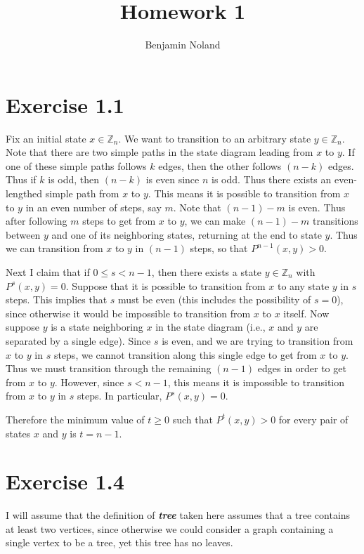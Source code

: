 \documentclass[12pt]{article}
\title{Homework 1}
\author{Benjamin Noland}
\date{}
\begin{document}
\maketitle

\section*{Exercise 1.1}

Fix an initial state $x \in \mathbb{Z}_n$. We want to transition to an arbitrary state $y \in \mathbb{Z}_n$. Note that there are two simple paths in the state diagram leading from $x$ to $y$. If one of these simple paths follows $k$ edges, then the other follows $(n - k)$ edges. Thus if $k$ is odd, then $(n - k)$ is even since $n$ is odd. Thus there exists an even-lengthed simple path from $x$ to $y$. This means it is possible to transition from $x$ to $y$ in an even number of steps, say $m$. Note that $(n - 1) - m$ is even. Thus after following $m$ steps to get from $x$ to $y$, we can make $(n - 1) - m$ transitions between $y$ and one of its neighboring states, returning at the end to state $y$. Thus we can transition from $x$ to $y$ in $(n - 1)$ steps, so that $P^{n-1}(x, y) > 0$.

Next I claim that if $0 \leq s < n - 1$, then there exists a state $y \in \mathbb{Z}_n$ with $P^s(x, y) = 0$. Suppose that it is possible to transition from $x$ to any state $y$ in $s$ steps. This implies that $s$ must be even (this includes the possibility of $s = 0$), since otherwise it would be impossible to transition from $x$ to $x$ itself. Now suppose $y$ is a state neighboring $x$ in the state diagram (i.e., $x$ and $y$ are separated by a single edge). Since $s$ is even, and we are trying to transition from $x$ to $y$ in $s$ steps, we cannot transition along this single edge to get from $x$ to $y$. Thus we must transition through the remaining $(n - 1)$ edges in order to get from $x$ to $y$. However, since $s < n - 1$, this means it is impossible to transition from $x$ to $y$ in $s$ steps. In particular, $P^s(x, y) = 0$.

Therefore the minimum value of $t \geq 0$ such that $P^t(x, y) > 0$ for every pair of states $x$ and $y$ is $t = n - 1$.

\section*{Exercise 1.4}

I will assume that the definition of \textbf{\emph{tree}} taken here assumes that a tree contains at least two vertices, since otherwise we could consider a graph containing a single vertex to be a tree, yet this tree has no leaves.
\end{document}
